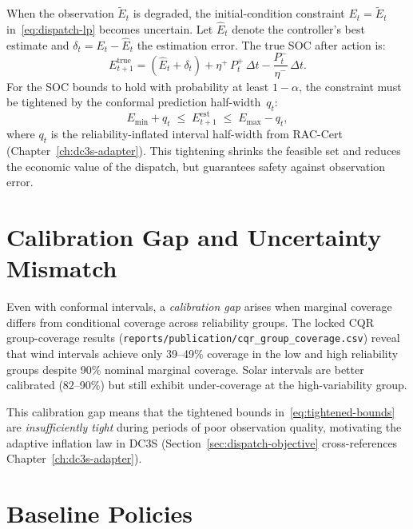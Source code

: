 When the observation $\tilde{E}_t$ is degraded, the initial-condition
constraint $E_t = \tilde{E}_t$ in~\eqref{eq:dispatch-lp} becomes uncertain.
Let $\hat{E}_t$ denote the controller's best estimate and
$\delta_t = E_t - \hat{E}_t$ the estimation error.  The true SOC after action
is:
\begin{equation}
\label{eq:soc-uncertain}
  E_{t+1}^{\mathrm{true}} = (\hat{E}_t + \delta_t)
    + \eta^{+}\,P_t^{+}\,\Delta t - \frac{P_t^{-}}{\eta^{-}}\,\Delta t.
\end{equation}
For the SOC bounds to hold with probability at least $1 - \alpha$, the
constraint must be tightened by the conformal prediction half-width~$q_t$:
\begin{equation}
\label{eq:tightened-bounds}
  E_{\min} + q_t \;\le\; E_{t+1}^{\mathrm{est}} \;\le\; E_{\max} - q_t,
\end{equation}
where $q_t$ is the reliability-inflated interval half-width from RAC-Cert
(Chapter~\ref{ch:dc3s-adapter}).  This tightening shrinks the feasible set
and reduces the economic value of the dispatch, but guarantees safety
against observation error.

\section{Calibration Gap and Uncertainty Mismatch}

Even with conformal intervals, a \emph{calibration gap} arises when marginal
coverage differs from conditional coverage across reliability groups.  The
locked CQR group-coverage results
(\texttt{reports/publication/cqr\_group\_coverage.csv}) reveal that wind
intervals achieve only 39--49\% coverage in the low and high reliability
groups despite 90\% nominal marginal coverage.  Solar intervals are better
calibrated (82--90\%) but still exhibit under-coverage at the high-variability
group.

This calibration gap means that the tightened bounds
in~\eqref{eq:tightened-bounds} are \emph{insufficiently tight} during periods
of poor observation quality, motivating the adaptive inflation law in DC3S
(Section~\ref{sec:dispatch-objective} cross-references
Chapter~\ref{ch:dc3s-adapter}).

\section{Baseline Policies}

